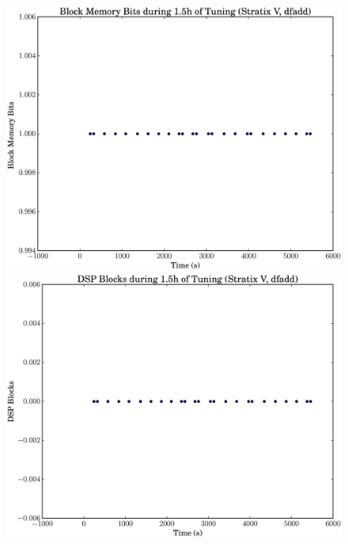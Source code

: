\documentclass[12pt, a4paper]{article}
\begin{document}
\begin{figure}[htpb]
    \begin{minipage}{.48\textwidth}
        \includegraphics[scale=.25]{dfadd_block_5400_chstone_StratixV}
    \end{minipage}%
    \hfill
    \begin{minipage}{.48\textwidth}
        \includegraphics[scale=.25]{dfadd_dsp_5400_chstone_StratixV}
    \end{minipage}%


\end{figure}
\end{document}

